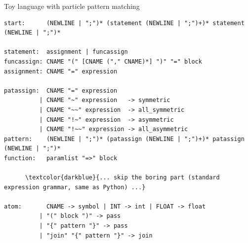 \documentclass[aspectratio=169]{beamer}
\begin{document}
\begin{frame}[fragile]{Toy language with particle pattern matching}
\vspace{0.25 cm}
\scriptsize
\begin{Verbatim}[commandchars=\\\{\}]
start:      (NEWLINE | ";")* (statement (NEWLINE | ";")+)* statement (NEWLINE | ";")*

statement:  assignment | funcassign
funcassign: CNAME "(" [CNAME ("," CNAME)*] ")" "=" block
assignment: CNAME "=" expression

patassign:  CNAME "=" expression
          | CNAME "~" expression   -> symmetric
          | CNAME "~~" expression  -> all_symmetric
          | CNAME "!~" expression  -> asymmetric
          | CNAME "!~~" expression -> all_asymmetric
pattern:    (NEWLINE | ";")* (patassign (NEWLINE | ";")+)* patassign (NEWLINE | ";")*
function:   paramlist "=>" block

      \textcolor{darkblue}{... skip the boring part (standard expression grammar, same as Python) ...}

atom:       CNAME -> symbol | INT -> int | FLOAT -> float
          | "(" block ")" -> pass
          | "{" pattern "}" -> pass
          | "join" "{" pattern "}" -> join
\end{Verbatim}

\vspace{0.25 cm}
\end{frame}
\end{document}
